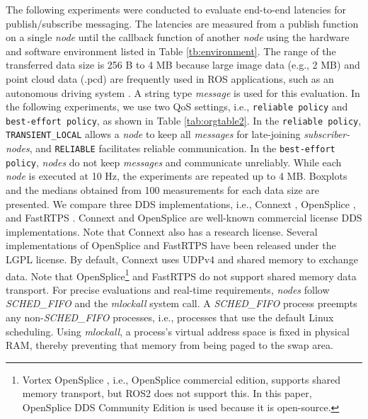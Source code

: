 \documentclass{sig-alternate-05-2015}
\begin{document}
The following experiments were conducted to evaluate end-to-end latencies for publish/subscribe messaging. 
The latencies are measured from a publish function on a single \emph{node} until the callback function of another \emph{node} using the hardware and software environment listed in Table \ref{tb:environment}. 
The range of the transferred data size is 256 B to 4 MB because large image data (e.g., 2 MB) and point cloud data (.pcd) are frequently used in ROS applications, such as an autonomous driving system \cite{kato2015open}.
A string type \emph{message} is used for this evaluation.
In the following experiments, we use two QoS settings, i.e.,  \texttt{reliable policy} and \texttt{best-effort policy}, as shown in Table \ref{tab:orgtable2}. 
In the \texttt{reliable policy}, \texttt{TRANSIENT\_LOCAL} allows a \emph{node} to keep all \emph{messages} for late-joining \emph{subscriber-nodes}, and \texttt{RELIABLE} facilitates reliable communication.
In the \texttt{best-effort policy}, \emph{nodes} do not keep \emph{messages} and communicate unreliably.
While each \emph{node} is executed at 10 Hz, the experiments are repeated up to 4 MB. Boxplots and the medians obtained from 100 measurements for each data size are presented.
We compare three DDS implementations, i.e., Connext \cite{rti_connext}, OpenSplice \cite{ospl_dds_community}, and FastRTPS \cite{fastrtps}. 
Connext and OpenSplice are well-known commercial license DDS implementations. 
Note that Connext also has a research license. 
Several implementations of OpenSplice and FastRTPS have been released under the LGPL license. 
By default, Connext uses UDPv4 and shared memory to exchange data. 
Note that OpenSplice\footnote{Vortex OpenSplice \cite{ospl_vortex}, i.e., OpenSplice commercial edition, supports shared memory transport, but ROS2 does not support this. In this paper, OpenSplice DDS Community Edition is used because it is open-source.} 
and FastRTPS do not support shared memory data transport. 
For precise evaluations and real-time requirements, \emph{nodes} follow \emph{SCHED\_FIFO} \cite{garg2009real} and the \emph{mlockall} system call. 
A \emph{SCHED\_FIFO} process preempts any non-\emph{SCHED\_FIFO} processes, i.e., processes that use the default Linux scheduling.
Using \emph{mlockall}, a process's virtual address space is fixed in physical RAM, thereby preventing that memory from being paged to the swap area.
\end{document}
